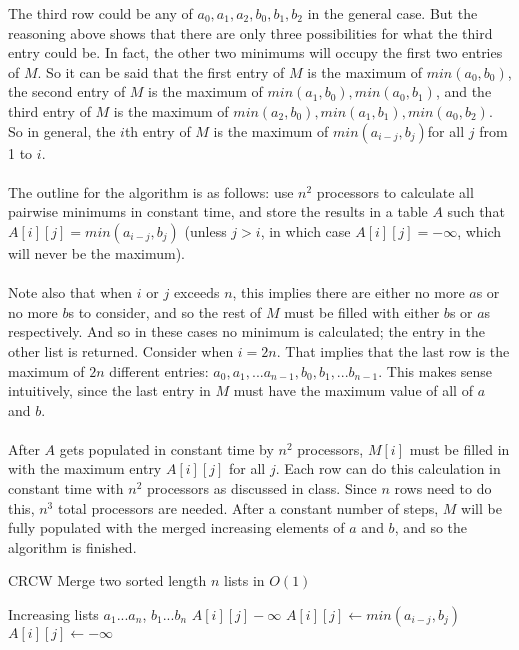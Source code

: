 \documentclass[letterpaper,notitlepage,twoside]{article}
\begin{document}
The third row could be any of $a_0, a_1, a_2, b_0, b_1, b_2$ in the general case. But the reasoning above shows that there are only three possibilities for what the third entry could be. In fact, the other two minimums will occupy the first two entries of $M$. So it can be said that the first entry of $M$ is the maximum of $min(a_0, b_0)$, the second entry of $M$ is the maximum of $min(a_1, b_0), min(a_0, b_1)$, and the third entry of $M$ is the maximum of $min(a_2, b_0), min(a_1, b_1), min(a_0, b_2)$. So in general, the $i$th entry of $M$ is the maximum of $min(a_{i - j}, b_j)$for all $j$ from 1 to $i$.
\\\\
The outline for the algorithm is as follows: use $n^2$ processors to calculate all pairwise minimums in constant time, and store the results in a table $A$ such that $A[i][j] = min(a_{i - j}, b_j)$ (unless $j > i$, in which case $A[i][j] = -\infty$, which will never be the maximum).
\\\\
Note also that when $i$ or $j$ exceeds $n$, this implies there are either no more $a$s or no more $b$s to consider, and so the rest of $M$ must be filled with either $b$s or $a$s respectively. And so in these cases no minimum is calculated; the entry in the other list is returned. Consider when $i = 2n$. That implies that the last row is the maximum of $2n$ different entries: $a_0, a_1, ... a_{n - 1}, b_0, b_1, ... b_{n - 1}$. This makes sense intuitively, since the last entry in $M$ must have the maximum value of all of $a$ and $b$.
\\\\
After $A$ gets populated in constant time by $n^2$ processors, $M[i]$ must be filled in with the maximum entry $A[i][j]$ for all $j$. Each row can do this calculation in constant time with $n^2$ processors as discussed in class. Since $n$ rows need to do this, $n^3$ total processors are needed. After a constant number of steps, $M$ will be fully populated with the merged increasing elements of $a$ and $b$, and so the algorithm is finished.

\begin{algorithm}[H]
	\begin{algorithmic}%
		\caption{CRCW Merge two sorted length $n$ lists in $O(1)$}
		\Require Increasing lists $a_1...a_n$, $b_1...b_n$
		 
				\State $A[i][j] -\infty$
			\Else
				\State $A[i][j] \gets min(a_{i - j}, b_j)$
			\EndIf
		\Else
			\State $A[i][j] \gets -\infty$
		\EndIf
		
		
	\end{algorithmic}
\end{algorithm}
\end{document}
